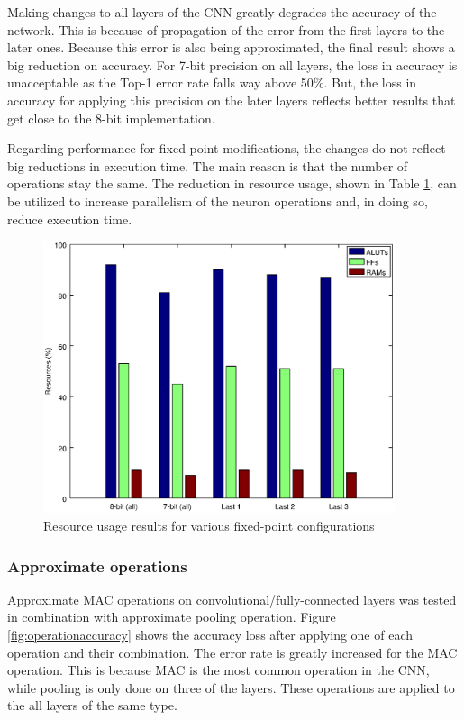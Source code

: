 \begin{enumerate}
Making changes to all layers of the CNN greatly degrades the accuracy of the network.
This is because of propagation of the error from the first layers to the later ones.
Because this error is also being approximated, the final result shows a big reduction 
on accuracy. For 7-bit precision on all layers, the loss in accuracy is unacceptable as
the Top-1 error rate falls way above 50\%. But, the loss in accuracy for applying 
this precision on the later layers reflects better results that get close to the 8-bit implementation.

Regarding performance for fixed-point modifications, the changes do not reflect big reductions
in execution time. The main reason is that the number of operations stay the same. The reduction
in resource usage, shown in Table \ref{fig:fpresource}, can be utilized to increase parallelism
of the neuron operations and, in doing so, reduce execution time.

\begin{figure}[H]
    \centering
    \includegraphics[height=8cm]{fig/fpresource.eps}
    \caption{Resource usage results for various fixed-point configurations}
    \label{fig:fpresource}
\end{figure}

\subsubsection{Approximate operations}

Approximate MAC operations on convolutional/fully-connected layers was tested in combination with
approximate pooling operation. Figure \ref{fig:operationaccuracy} shows the accuracy loss after
applying one of each operation and their combination.
The error rate is greatly increased for the MAC operation. This is because MAC is the most
common operation in the CNN, while pooling is only done on three of the layers.
These operations are applied to the all layers of the same type.


\end{enumerate}
